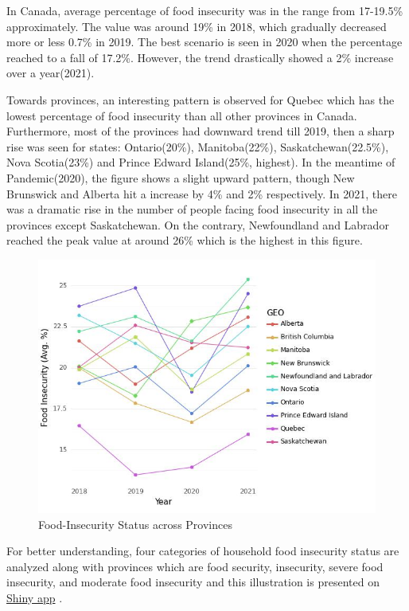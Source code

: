 \documentclass[11pt]{article}
\begin{document}
In Canada, average percentage of food insecurity was in the range from 17-19.5\% approximately. The value was around 19\% in 2018, which gradually decreased more or less 0.7\% in 2019. The best scenario is seen in 2020 when the percentage reached to a fall of 17.2\%. However, the trend drastically showed a 2\% increase over a year(2021).

Towards provinces, an interesting pattern is observed for Quebec which has the lowest percentage of food insecurity than all other provinces in Canada. Furthermore, most of the provinces had downward trend till 2019, then a sharp rise was seen for states:  Ontario(20\%), Manitoba(22\%), Saskatchewan(22.5\%), Nova Scotia(23\%) and Prince Edward Island(25\%, highest). In the meantime of Pandemic(2020), the figure shows a slight upward pattern, though New Brunswick and Alberta hit a increase by 4\% and 2\% respectively. In 2021, there was a dramatic rise in the number of people facing food insecurity in all the provinces except Saskatchewan. On the contrary, Newfoundland and Labrador reached the peak value at around 26\% which is the highest in this figure.

\begin{figure}
\centering
\includegraphics[width=0.75\linewidth]{images/food_insecurity_provinces.jpeg}
\caption{\label{fig:food_insecurity_provinces} Food-Insecurity Status across Provinces}
\end{figure}

For better understanding, four categories of household food insecurity status are analyzed along with provinces which are food security, insecurity, severe food insecurity, and moderate food insecurity and this illustration is presented on \href{https://sujana27.shinyapps.io/cse780-assignment-one}{Shiny app} \cite{shinyapp}.
\end{document}
